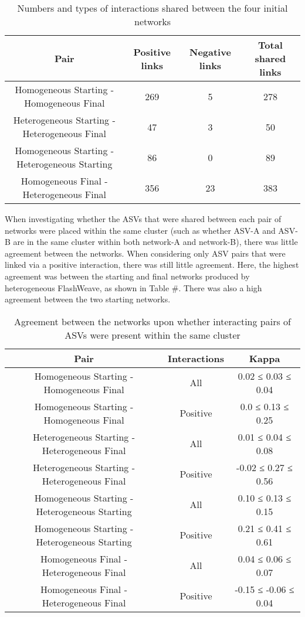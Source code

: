 \documentclass[11pt]{article}
\begin{document}
\begin{table}[h]
\centering
\caption{Numbers and types of interactions shared between the four initial networks}
\label{tab:sample}
\begin{tabular}{|c|c|c|c|}
\hline
Pair & Positive links & Negative links & Total shared links \\
\hline
Homogeneous Starting - Homogeneous Final & 269 & 5 & 278 \\
Heterogeneous Starting - Heterogeneous Final & 47 & 3 & 50 \\
Homogeneous Starting - Heterogeneous Starting & 86 & 0 & 89 \\
Homogeneous Final - Heterogeneous Final & 356 & 23 & 383 \\
\hline
\end{tabular}
\end{table}

When investigating whether the ASVs that were shared between each pair of networks were placed within the same cluster (such as whether ASV-A and ASV-B are in the same cluster within both network-A and network-B), there was little agreement between the networks. When considering only ASV pairs that were linked via a positive interaction, there was still little agreement. Here, the highest agreement was between the starting and final networks produced by heterogeneous FlashWeave, as shown in Table #. There was also a high agreement between the two starting networks.

\begin{table}[h]
\centering
\caption{Agreement between the networks upon whether interacting pairs of ASVs were present within the same cluster}
\label{tab:sample}
\begin{tabular}{|c|c|c|}
\hline
Pair & Interactions & Kappa \\
\hline
Homogeneous Starting - Homogeneous Final & All & 0.02 ≤ 0.03 ≤ 0.04 \\
Homogeneous Starting - Homogeneous Final & Positive & 0.0 ≤ 0.13 ≤ 0.25 \\
Heterogeneous Starting - Heterogeneous Final & All & 0.01 ≤ 0.04 ≤ 0.08 \\
Heterogeneous Starting - Heterogeneous Final & Positive & -0.02 ≤ 0.27 ≤ 0.56 \\
Homogeneous Starting - Heterogeneous Starting & All & 0.10 ≤ 0.13 ≤ 0.15 \\
Homogeneous Starting - Heterogeneous Starting & Positive & 0.21 ≤ 0.41 ≤ 0.61 \\
Homogeneous Final - Heterogeneous Final & All & 0.04 ≤ 0.06 ≤ 0.07 \\
Homogeneous Final - Heterogeneous Final & Positive & -0.15 ≤ -0.06 ≤ 0.04 \\
\hline
\end{tabular}
\end{table}
\end{document}
